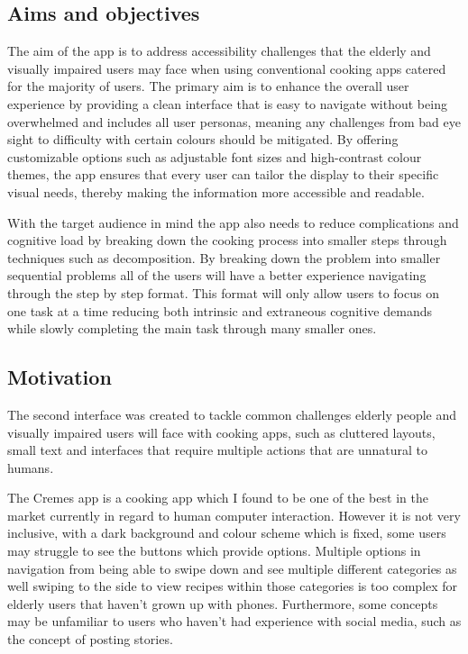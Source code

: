 \documentclass[]{project_final}
\begin{document}
\subsection{Aims and objectives}
The aim of the app is to address accessibility challenges that the elderly and visually impaired users may face when using conventional cooking apps catered for the majority of users. The primary aim is to enhance the overall user experience by providing a clean interface that is easy to navigate without being overwhelmed and includes all user personas, meaning any challenges from bad eye sight to difficulty with certain colours should be mitigated. By offering customizable options such as adjustable font sizes and high-contrast colour themes, the app ensures that every user can tailor the display to their specific visual needs, thereby making the information more accessible and readable.

With the target audience in mind the app also needs to reduce complications and cognitive load by breaking down the cooking process into smaller steps through techniques such as decomposition. By breaking down the problem into smaller sequential problems all of the users will have a better experience navigating through the step by step format. This format will only allow users to focus on one task at a time reducing both intrinsic and extraneous cognitive demands while slowly completing the main task through many smaller ones.

\subsection{Motivation}
The second interface was created to tackle common challenges elderly people and visually impaired users will face with cooking apps, such as cluttered layouts, small text and interfaces that require multiple actions that are unnatural to humans.

The Cremes app is a cooking app which I found to be one of the best in the market currently in regard to human computer interaction. However it is not very inclusive, with a dark background and colour scheme which is fixed, some users may struggle to see the buttons which provide options. Multiple options in navigation from being able to swipe down and see multiple different categories as well swiping to the side to view recipes within those categories is too complex for elderly users that haven’t grown up with phones. Furthermore, some concepts may be unfamiliar to users who haven’t had experience with social media, such as the concept of posting stories.
\end{document}

